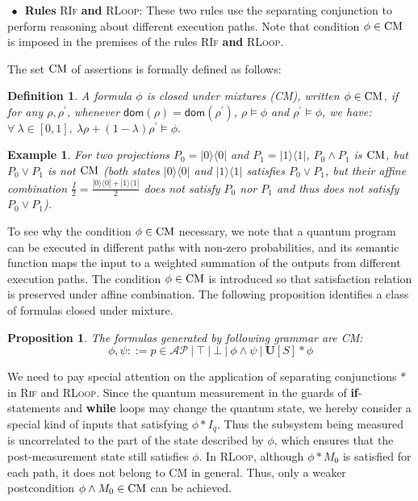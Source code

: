 \documentclass[conference,compsoc, 10pt]{IEEEtran}
\newtheorem{definition}{Definition}[section]
\newtheorem{proposition}{Proposition}[section]
\newtheorem{example}{Example}[section]
\newcommand {\qbar} {{\overline{q}}}
\newcommand {\id } {{I}}
\newcommand {\dom }[1] {{\mathsf{dom}\!\left(#1\right)}}
\newcommand {\unia } {{\mathbf{U}}}
\newcommand {\AP} {{\mathcal{AP}}}
\begin{document}
    
	\vspace{0.2cm}
	
    \noindent$\ \bullet\, $ \textbf{Rules} \textsc{RIf} \textbf{and} \textsc{RLoop}:
      These two rules use the separating conjunction to perform reasoning about
      different execution paths. 
      Note that condition $\phi\in {\rm CM}$ is imposed in the premises of the rules \textsc{RIf} \textbf{and} \textsc{RLoop}. 
      
The set ${\rm CM}$ of assertions is formally defined as follows:
	\begin{definition}
		\label{def CM}
			A formula $\phi$ is closed under mixtures (CM), written $\phi\in{\rm CM}$, if for any $\rho,\rho^\prime$, whenever  $\dom{\rho}=\dom{\rho^\prime}$, $\rho\models\phi$ and $\rho^\prime\models\phi$, we have:
			$\forall\ \lambda\in[0,1],\ \lambda\rho+(1-\lambda)\rho^\prime\models\phi.$
		\end{definition}
		\begin{example}
			For two projections $P_0 = |0\rangle\langle0|$ and $P_1 = |1\rangle\langle1|$, $P_0\wedge P_1$ is ${\rm CM}$, but $P_0\vee P_1$ is not ${\rm CM}$ (both states $|0\rangle\langle0|$ and $|1\rangle\langle1|$ satisfies $P_0\vee P_1$, but their affine combination $\frac{I}{2} = \frac{|0\rangle\langle0|+|1\rangle\langle1|}{2}$ does not satisfy $P_0$ nor $P_1$ and thus does not satisfy $P_0\vee P_1$).
		\end{example}
		To see why  the  condition $\phi\in {\rm CM}$ necessary, we note that a quantum program can be executed in different paths with non-zero probabilities, and its semantic function maps the input to a weighted summation of the outputs from different execution paths. The condition $\phi\in {\rm CM}$ is introduced so that satisfaction relation is preserved under affine combination. 
		The following proposition identifies a class of formulas closed under mixture. 
		
		\begin{proposition}
			\label{prop CM}
			The formulas generated by following grammar are CM:
			$$
			\phi,\psi ::= p\in\AP\ |\ \top\ |\ \bot\ |\ \phi\wedge\psi\ |\ \unia[S]\ast\phi
			$$
		\end{proposition}
		
		We need to pay special attention on the application of 
		separating conjunctions $\ast$ in \textsc{Rif} and \textsc{RLoop}. Since the
    quantum measurement in the guards of {\bf if}-statements and {\bf while}
    loops may change the quantum state, we hereby consider a special kind of
    inputs that satisfying $\phi \ast \id_\qbar$. Thus the subsystem being
    measured is uncorrelated to the part of the state described by $\phi$, which ensures that the post-measurement state still satisfies $\phi$. In \textsc{RLoop}, although $\phi\ast M_0$ is satisfied for each path, it does not belong to CM in general. Thus, only a weaker postcondition $\phi\wedge M_0\in {\rm CM}$ can be achieved. 
	
\end{document}
